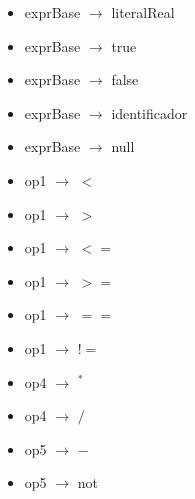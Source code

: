 \documentclass[11pt]{article}
\begin{document}
\begin{itemize}
                \item exprBase $\rightarrow$ literalReal
                \item exprBase $\rightarrow$ true
                \item exprBase $\rightarrow$ false
                \item exprBase $\rightarrow$ identificador
                \item exprBase $\rightarrow$ null
                \item op1 $\rightarrow$ $<$
                \item op1 $\rightarrow$ $>$
                \item op1 $\rightarrow$ $<=$
                \item op1 $\rightarrow$ $>=$
                \item op1 $\rightarrow$ $==$
                \item op1 $\rightarrow$ $!=$
                \item op4 $\rightarrow$ $^{\ast}$
                \item op4 $\rightarrow$ $/$
                \item op5 $\rightarrow$ $-$
                \item op5 $\rightarrow$ not
            \end{itemize}
\end{document}
